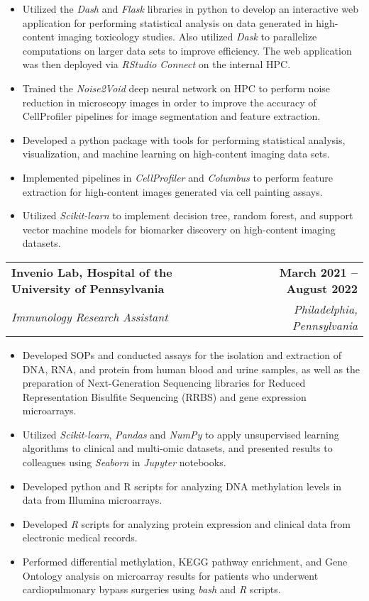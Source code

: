 \documentclass[letterpaper,11pt]{article}
\makeatletter
\newcommand{\resumeItem}[1]{
  \item\small{
    {#1 \vspace{-2pt}}
  }
}
\newcommand{\resumeSubheading}[4]{
  \vspace{-2pt}\item
    \begin{tabular*}{1.0\textwidth}[t]{l@{\extracolsep{\fill}}r}
      \textbf{#1} & \textbf{\small #2} \\
      \textit{\small#3} & \textit{\small #4} \\
    \end{tabular*}\vspace{-7pt}
}
\newcommand{\resumeItemListStart}{\begin{itemize}}
\newcommand{\resumeItemListEnd}{\end{itemize}\vspace{-5pt}}
\makeatother
\begin{document}
\vspace{-5pt}
\resumeItemListStart
\resumeItem{
    Utilized the \textit{Dash} and \textit{Flask} libraries in python to develop
    an interactive web application for performing statistical analysis on data
    generated in high-content imaging toxicology studies. Also utilized
    \textit{Dask} to parallelize computations on larger data sets to improve
    efficiency. The web application was then deployed via \textit{RStudio Connect}
    on the internal HPC.
}
\resumeItem{
    Trained the \textit{Noise2Void} deep neural network on HPC to perform noise
    reduction in microscopy images in order to improve the accuracy of CellProfiler
    pipelines for image segmentation and feature extraction.
}
\resumeItem{
    Developed a python package with tools for performing statistical analysis,
    visualization, and machine learning on high-content imaging data sets.
}
\resumeItem{
    Implemented pipelines in \textit{CellProfiler} and \textit{Columbus} to
    perform feature extraction for high-content images generated via cell painting
    assays.
}
\resumeItem{
    Utilized \textit{Scikit-learn} to implement decision tree, random forest, and
    support vector machine models for biomarker discovery on high-content imaging
    datasets.
}
\resumeItemListEnd

\resumeSubheading
{Invenio Lab, Hospital of the University of Pennsylvania}
{March 2021 -- August 2022}
{Immunology Research Assistant}
{Philadelphia, Pennsylvania}

\vspace{-5pt}
\resumeItemListStart
\resumeItem{
    Developed SOPs and conducted assays for the isolation and extraction of DNA,
    RNA, and protein from human blood and urine samples, as well as the
    preparation of Next-Generation Sequencing libraries for Reduced Representation
    Bisulfite Sequencing (RRBS) and gene expression microarrays.
}
\resumeItem{
    Utilized \emph{Scikit-learn}, \emph{Pandas} and \emph{NumPy} to apply
    unsupervised learning algorithms to clinical and multi-omic datasets, and
    presented results to colleagues using \emph{Seaborn} in \emph{Jupyter}
    notebooks.
}
\resumeItem{
    Developed python and R scripts for analyzing DNA methylation levels in data
    from Illumina microarrays.
}
\resumeItem{
    Developed \emph{R} scripts for analyzing protein expression and clinical data
    from electronic medical records.
}
\resumeItem{
    Performed differential methylation, KEGG pathway enrichment, and Gene Ontology
    analysis on microarray results for patients who underwent cardiopulmonary
    bypass surgeries using \emph{bash} and \emph{R} scripts.
}
\resumeItemListEnd
\end{document}
